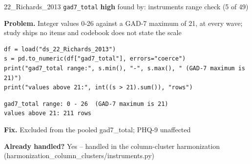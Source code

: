\documentclass[9pt, t, handout]{beamer}
\newcommand{\ans}[1]{\textcolor{structure.fg}{#1}}
\begin{document}
\begin{frame}[fragile]{22\_Richards\_2013 \quad \texttt{gad7\_total}}
  {\scriptsize\textcolor{orange!80!black}{\textbf{high}} \quad
   found by: instruments range check \quad (5 of 49)}
  \vspace{3pt}

  {\footnotesize \textbf{Problem.} Integer values 0-26 against a GAD-7 maximum of 21, at every wave; study ships no items and codebook does not state the scale}
  \vspace{4pt}

  \begin{Verbatim}[fontsize=\tiny, frame=single, framesep=2pt, label=\tiny reproduce]
df = load("ds_22_Richards_2013")
s = pd.to_numeric(df["gad7_total"], errors="coerce")
print("gad7_total range:", s.min(), "-", s.max(), " (GAD-7 maximum is 21)")
print("values above 21:", int((s > 21).sum()), "rows")
  \end{Verbatim}
  \begin{Verbatim}[fontsize=\tiny, frame=single, framesep=2pt, label=\tiny output]
gad7_total range: 0 - 26  (GAD-7 maximum is 21)
values above 21: 211 rows
  \end{Verbatim}
  \vspace{2pt}

  {\footnotesize \textbf{Fix.} Excluded from the pooled gad7\_total; PHQ-9 unaffected}
  \vspace{2pt}

  {\footnotesize \textbf{Already handled?} \ans{Yes} -- handled in the column-cluster harmonization
   (harmonization\_column\_clusters/instruments.py)}
\end{frame}
\end{document}
